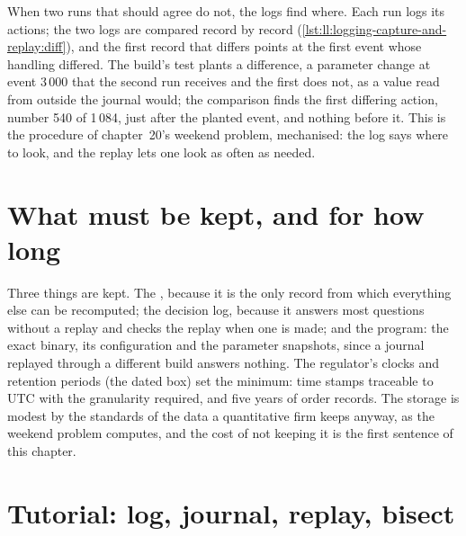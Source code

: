 When two runs that should agree do not, the logs find where. Each run logs its actions; the two logs are compared record by
record (\cref{lst:ll:logging-capture-and-replay:diff}), and the first record that differs points at the first event whose
handling differed. The build's test plants a difference, a parameter change at event 3\,000 that the second run receives and
the first does not, as a value read from outside the journal would; the comparison finds the first differing action,
number 540 of 1\,084, just after the planted event, and nothing before it. This is the procedure of chapter~20's weekend problem,
mechanised: the log says where to look, and the replay lets one look as often as needed.

\label{lst:ll:logging-capture-and-replay:diff}

\section{What must be kept, and for how long}

Three things are kept. The , because it is the only record from which everything else can be recomputed; the
decision log, because it answers most questions without a replay and checks the replay when one is made; and the program:
the exact binary, its configuration and the parameter snapshots, since a journal replayed through a different build answers
nothing. The regulator's clocks and retention periods (the dated box) set the minimum: time stamps traceable to UTC with the
granularity required, and five years of order records. The storage is modest by the standards of the data a quantitative firm
keeps anyway, as the weekend problem computes, and the cost of not keeping it is the first sentence of this chapter.

\section{Tutorial: log, journal, replay, bisect}\label{tut:ll:logging-capture-and-replay:tut}


